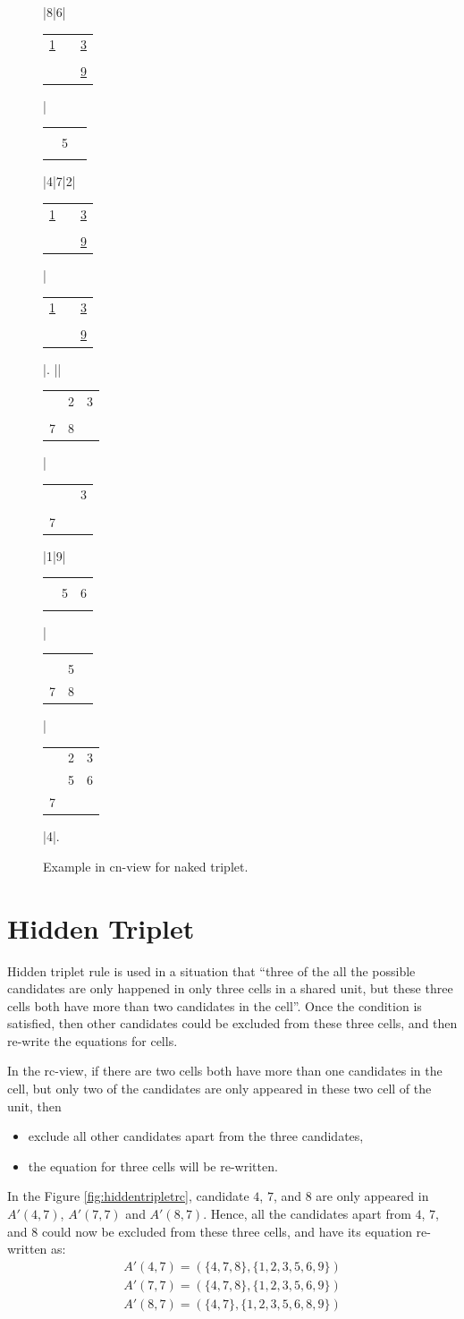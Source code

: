 \documentclass[11pt]{report}
\newcommand{\cell}[9]{%
\scriptsize
\setlength{\tabcolsep}{1pt}
\renewcommand{\arraystretch}{0.5}
\hspace{-0.6em}
\begin{tabular}{ccc}
#1 & #2 & #3\\
#4 & #5 & #6\\
#7 & #8 & #9
\end{tabular}
}
\newcommand{\set}[1]{\{ #1 \}}
\begin{document}
\begin{figure}[htbp]
\begin{sudoku}
|{8}|6|{\cell {\underline 1}{}{\underline 3}{}{}{}{}{}{\underline 9}}|{\cell {}{}{}{}5{}{}{}{}}|4|7|2|{\cell {\underline 1}{}{\underline 3}{}{}{}{}{}{\underline 9}}|{\cell {\underline 1}{}{\underline 3}{}{}{}{}{}{\underline 9}}|.
|{\makebox[0pt]{\hspace{-2.1em}\large c9}{\cell {}23{}56{}{}{}}}|{\cell {}23{}{}{}78{}}|{\cell {}{}3{}{}{}7{}{}}|1|9|{\cell {}{}{}{}56{}{}{}}|{\cell {}{}{}{}5{}78{}}|{\cell {}23{}567{}{}}|4|.
\end{sudoku}
\caption{Example in cn-view for naked triplet.}
\label{fig:nakedtripletcn}
\end{figure}


\section{Hidden Triplet}
\label{sec:Hidden Triplet}
Hidden triplet rule is used in a situation that ``three of the all the possible candidates are only happened in only three cells in a shared unit, but these three cells both have more than two candidates in the cell''. Once the condition is satisfied, then other candidates could be excluded from these three cells, and then re-write the equations for cells.

In the rc-view, if there are two cells both have more than one candidates in the cell, but only two of the candidates are only appeared in these two cell of the unit, then
\begin{itemize}
\item exclude all other candidates apart from the three candidates,
\item the equation for three cells will be re-written.
\end{itemize}

In the Figure \ref{fig:hiddentripletrc}, candidate $4$, $7$, and $8$ are only appeared in $A'(4,7)$, $A'(7,7)$ and $A'(8,7)$. Hence, all the candidates apart from $4$, $7$, and $8$ could now be excluded from these three cells, and have its equation re-written as:
\begin{eqnarray*}
A'(4,7) = (\set{4, 7, 8}, \set{1, 2, 3, 5, 6, 9})\\
A'(7,7) = (\set{4, 7, 8}, \set{1, 2, 3, 5, 6, 9})\\
A'(8,7) = (\set{4, 7}, \set{1, 2, 3, 5, 6, 8, 9})\\
\end{eqnarray*}
\end{document}
